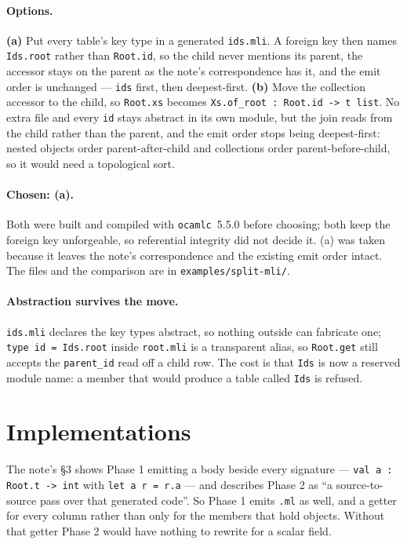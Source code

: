\documentclass[11pt,a4paper]{article}
\begin{document}
\paragraph{Options.} \textbf{(a)} Put every table's key type in a generated
\texttt{ids.mli}. A foreign key then names \texttt{Ids.root} rather than
\texttt{Root.id}, so the child never mentions its parent, the accessor stays
on the parent as the note's correspondence has it, and the emit order is
unchanged --- \texttt{ids} first, then deepest-first. \textbf{(b)} Move the
collection accessor to the child, so \texttt{Root.xs} becomes
\texttt{Xs.of\_root : Root.id -> t list}. No extra file and every \texttt{id}
stays abstract in its own module, but the join reads from the child rather
than the parent, and the emit order stops being deepest-first: nested objects
order parent-after-child and collections order parent-before-child, so it
would need a topological sort.

\paragraph{Chosen: (a).} Both were built and compiled with
\texttt{ocamlc}~5.5.0 before choosing; both keep the foreign key unforgeable,
so referential integrity did not decide it. (a) was taken because it leaves
the note's correspondence and the existing emit order intact. The files and
the comparison are in \texttt{examples/split-mli/}.

\paragraph{Abstraction survives the move.} \texttt{ids.mli} declares the key
types abstract, so nothing outside can fabricate one; \texttt{type id =
Ids.root} inside \texttt{root.mli} is a transparent alias, so
\texttt{Root.get} still accepts the \texttt{parent\_id} read off a child row.
The cost is that \texttt{Ids} is now a reserved module name: a member that
would produce a table called \texttt{Ids} is refused.

\section{Implementations}\label{sec:impl}

The note's \S3 shows Phase 1 emitting a body beside every signature ---
\texttt{val a : Root.t -> int} with \texttt{let a r = r.a} --- and describes
Phase 2 as ``a source-to-source pass over that generated code''. So Phase 1
emits \texttt{.ml} as well, and a getter for every column rather than only
for the members that hold objects. Without that getter Phase 2 would have
nothing to rewrite for a scalar field.
\end{document}
